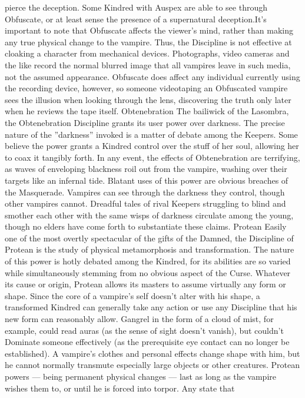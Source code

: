 \documentclass[10pt,a4paper]{article}
\begin{document}
pierce the deception.
Some Kindred with Auspex are able to see through Obfuscate, or at least
sense the presence of a supernatural deception.It’s important to note that Obfuscate affects the viewer’s mind, rather than
making any true physical change to the vampire. Thus, the Discipline is not
effective at cloaking a character from mechanical devices. Photographs,
video cameras and the like record the normal blurred image that all
vampires leave in such media, not the assumed appearance. Obfuscate does
affect any individual currently using the recording device, however, so
someone videotaping an Obfuscated vampire sees the illusion when looking
through the lens, discovering the truth only later when he reviews the tape
itself.
Obtenebration
The bailiwick of the Lasombra, the Obtenebration Discipline grants its user
power over darkness. The precise nature of the ”darkness” invoked is a
matter of debate among the Keepers. Some believe the power grants a
Kindred control over the stuff of her soul, allowing her to coax it tangibly
forth.
In any event, the effects of Obtenebration are terrifying, as waves of
enveloping blackness roil out from the vampire, washing over their targets
like an infernal tide. Blatant uses of this power are obvious breaches of the
Masquerade.
Vampires can see through the darkness they control, though other vampires
cannot. Dreadful tales of rival Keepers struggling to blind and smother each
other with the same wisps of darkness circulate among the young, though
no elders have come forth to substantiate these claims.
Protean
Easily one of the most overtly spectacular of the gifts of the Damned, the
Discipline of Protean is the study of physical metamorphosis and
transformation. The nature of this power is hotly debated among the
Kindred, for its abilities are so varied while simultaneously stemming from
no obvious aspect of the Curse. Whatever its cause or origin, Protean allows
its masters to assume virtually any form or shape.
Since the core of a vampire’s self doesn’t alter with his shape, a transformed
Kindred can generally take any action or use any Discipline that his new
form can reasonably allow. Gangrel in the form of a cloud of mist, for
example, could read auras (as the sense of sight doesn’t vanish), but
couldn’t Dominate someone effectively (as the prerequisite eye contact can
no longer be established). A vampire’s clothes and personal effects change
shape with him, but he cannot normally transmute especially large objects
or other creatures.
Protean powers — being permanent physical changes — last as long as the
vampire wishes them to, or until he is forced into torpor. Any state that
\end{document}
